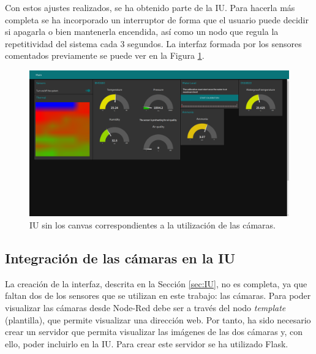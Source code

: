 Con estos ajustes realizados, se ha obtenido parte de la IU. Para hacerla más completa se ha incorporado un interruptor de forma que el usuario puede decidir si apagarla o bien mantenerla encendida, así como un nodo que regula la repetitividad del sistema cada 3 segundos. La interfaz formada por los sensores comentados previamente se puede ver en la Figura \ref{fig:ui_nocams}.
\begin{figure} [h!]
  \begin{center}
    \includegraphics[width=16cm]{figs/ui_nocams}
  \end{center}
  \caption{IU sin los canvas correspondientes a la utilización de las cámaras.}
  \label{fig:ui_nocams}
\end{figure}

\subsection{Integración de las cámaras en la IU}
La creación de la interfaz, descrita en la Sección \ref{sec:IU}, no es completa, ya que faltan dos de los sensores que se utilizan en este trabajo: las cámaras. Para poder visualizar las cámaras desde Node-Red debe ser a través del nodo \textit{template} (plantilla), que permite visualizar una dirección web. Por tanto, ha sido necesario crear un servidor que permita visualizar las imágenes de las dos cámaras y, con ello, poder incluirlo en la IU. Para crear este servidor se ha utilizado Flask.\\

